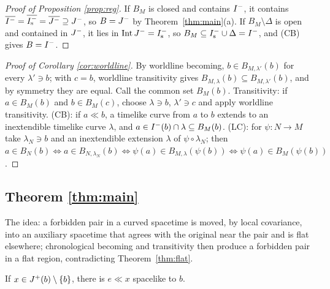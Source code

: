 \begin{proof}[Proof of Proposition \ref{prop:reg}]
If $B_M$ is closed and contains $I^{-}$, it contains
$\overline{I^{-}}=\overline{I^{-}_{\mathrm s}}=\overline{J^{-}}\supseteq J^{-}$, so
$B=J^{-}$ by Theorem~\ref{thm:main}(a). If $B_M\setminus\Delta$ is open and
contained in $J^{-}$, it lies in $\operatorname{Int}J^{-}=I^{-}_{\mathrm s}$, so
$B_M\subseteq I^{-}_{\mathrm s}\cup\Delta=I^{-}$, and (CB) gives $B=I^{-}$.
\end{proof}

\begin{proof}[Proof of Corollary \ref{cor:worldline}]
By worldline becoming, $b\in B_{M,\lambda'}(b)$ for every $\lambda'\ni b$; with
$c=b$, worldline transitivity gives $B_{M,\lambda}(b)\subseteq B_{M,\lambda'}(b)$,
and by symmetry they are equal. Call the common set $B_M(b)$. Transitivity: if
$a\in B_M(b)$ and $b\in B_M(c)$, choose $\lambda\ni b$, $\lambda'\ni c$ and apply
worldline transitivity. (CB): if $a\ll b$, a timelike curve from $a$ to $b$
extends to an inextendible timelike curve $\lambda$, and $a\in I^{-}(b)\cap\lambda
\subseteq B_M(b)$. (LC): for $\psi:N\to M$ take $\lambda_N\ni b$ and an
inextendible extension $\lambda$ of $\psi\circ\lambda_N$; then $a\in B_N(b)\iff
a\in B_{N,\lambda_N}(b)\iff\psi(a)\in B_{M,\lambda}(\psi(b))\iff\psi(a)\in
B_M(\psi(b))$.
\end{proof}

\subsection{Theorem \ref{thm:main}}

The idea: a forbidden pair in a curved spacetime is moved, by local
covariance, into an auxiliary spacetime that agrees with the original near
the pair and is flat elsewhere; chronological becoming and transitivity then
produce a forbidden pair in a flat region, contradicting
Theorem~\ref{thm:flat}.

\begin{lemma}\label{lem:R}
If $x\in J^{+}(b)\setminus\{b\}$, there is $e\ll x$ spacelike to $b$.
\end{lemma}

